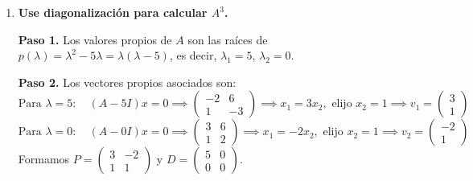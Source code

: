 \begin{prob}
\begin{enumerate}[$a)$]
\begin{myproof}
\textbf{Paso 4.} Ambos productos coinciden:
\[
\boxed{A^2 = 5A,}
\]
lo que verifica el teorema de Cayley-Hamilton para esta matriz.
\end{myproof}
\item \textbf{Use diagonalización para calcular $A^3$.}
\begin{myproof}
\textbf{Paso 1.} Los valores propios de $A$ son las raíces de $p(\lambda) = \lambda^2 - 5\lambda = \lambda(\lambda - 5)$, es decir, $\lambda_1 = 5$, $\lambda_2 = 0$.

\textbf{Paso 2.} Los vectores propios asociados son:
\[
\text{Para }\lambda=5: \quad (A - 5I)x = 0 \implies \begin{pmatrix} -2 & 6 \\ 1 & -3 \end{pmatrix} \implies x_1 = 3x_2, \text{ elijo } x_2 = 1 \implies v_1 = \begin{pmatrix} 3 \\ 1 \end{pmatrix}
\]
\[
\text{Para }\lambda=0: \quad (A - 0I)x = 0 \implies \begin{pmatrix} 3 & 6 \\ 1 & 2 \end{pmatrix} \implies x_1 = -2x_2, \text{ elijo } x_2 = 1 \implies v_2 = \begin{pmatrix} -2 \\ 1 \end{pmatrix}
\]
Formamos $P = \begin{pmatrix} 3 & -2 \\ 1 & 1 \end{pmatrix}$ y $D = \begin{pmatrix} 5 & 0 \\ 0 & 0 \end{pmatrix}$.


\end{myproof}
\end{enumerate}
\end{prob}
